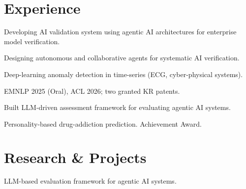 \documentclass[]{deedy-resume-openfont}
\begin{document}
\begin{minipage}[t]{0.66\textwidth}

\section{Experience}

\begin{tightemize}
\item Developing AI validation system using agentic AI architectures for enterprise model verification.
\item Designing autonomous and collaborative agents for systematic AI verification.
\end{tightemize}
\sectionsep

\begin{tightemize}
\item Deep-learning anomaly detection in time-series (ECG, cyber-physical systems).
\item EMNLP 2025 (Oral), ACL 2026; two granted KR patents.
\end{tightemize}
\sectionsep

\begin{tightemize}
\item Built LLM-driven assessment framework for evaluating agentic AI systems.
\end{tightemize}
\sectionsep

\begin{tightemize}
\item Personality-based drug-addiction prediction. Achievement Award.
\end{tightemize}
\sectionsep

\section{Research \& Projects}

 
LLM-based evaluation framework for agentic AI systems.
\sectionsep


\end{minipage}
\end{document}
